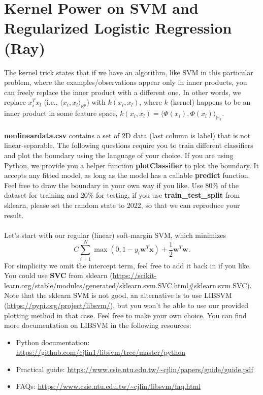 \documentclass{exam}
\begin{document}
\section{Kernel Power on SVM and Regularized Logistic Regression (Ray)}
The kernel trick states that if we have an algorithm, like SVM in this particular problem, where the examples/observations appear only in inner products, you can freely replace the inner product with a different one. In other words, we replace $x_{i}^{T}x_{l}$ (i.e., $\langle x_{i},x_{l} \rangle_{\mathbb{R}^{p}}$) with $k(x_{i},x_{l})$, where $k$ (kernel) happens to be an inner product in some feature space, $k(x_{i},x_{l})=\langle \Phi (x_{i}),\Phi (x_{l}) \rangle_{\mathbb{H}_{k}}$. \\\\
\textbf{nonlineardata.csv} contains a set of 2D data (last column is label) that is not linear-separable. The following questions require you to train different classifiers and plot the boundary using the language of your choice. If you are using Python, we provide you a helper function \textbf{plotClassifier} to plot the boundary. It accepts any fitted model, as long as the model has a callable \textbf{predict} function. Feel free to draw the boundary in your own way if you like. Use 80\% of the dataset for training and 20\% for testing, if you use \textbf{train\_test\_split} from sklearn, please set the random state to 2022, so that we can reproduce your result. \\\\
Let's start with our regular (linear) soft-margin SVM, which minimizes
\[ C \sum_{i=1}^N \max (0, 1- y_i\bm{w}^T\bm{x}) + \frac{1}{2}\bm{w}^T\bm{w}. \] For simplicity we omit the intercept term, feel free to add it back in if you like. You could use \textbf{SVC} from sklearn (\url{https://scikit-learn.org/stable/modules/generated/sklearn.svm.SVC.html#sklearn.svm.SVC}). Note that the sklearn SVM is not good, an alternative is to use LIBSVM (\url{https://pypi.org/project/libsvm/}), but you won't be able to use our provided plotting method in that case. Feel free to make your own choice. 
You can find more documentation on LIBSVM in the following resources:
\begin{itemize} %
    \item Python documentation: \url{https://github.com/cjlin1/libsvm/tree/master/python} 
    \item Practical guide: \url{https://www.csie.ntu.edu.tw/~cjlin/papers/guide/guide.pdf} 
    \item FAQs: \url{https://www.csie.ntu.edu.tw/~cjlin/libsvm/faq.html}
\end{itemize}
\end{document}

